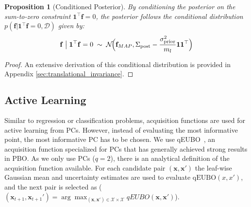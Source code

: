 \documentclass{article}
\newtheorem{proposition}{Proposition}
\begin{document}
\begin{proposition}[Conditioned Posterior]\label{prop:conditional}By conditioning the posterior on the sum-to-zero constraint $\mathbf{1}^\top\mathbf{f} = 0$, the posterior follows the conditional distribution $p(\mathbf{f}|\mathbf{1}^\top\mathbf{f} = 0, \mathcal{D})$ given by:$$ \mathbf{f}\;\bigl|\;\mathbf{1}^\top\mathbf{f} = 0 \;\sim\; \mathcal{N}\!\Bigl(\mathbf{f}_{MAP}, \Sigma_{\mathrm{post}}-\frac{\sigma_{\mathrm{prior}}^2}{m_l}\mathbf{1}\mathbf{1}^{\top}\Bigr) $$
\end{proposition}\begin{proof} An extensive derivation of this conditional distribution is provided in Appendix \ref{sec:translational_invariance}. \end{proof}



\subsection{Active Learning}\label{subsec:active_learning}
Similar to regression or classification problems, acquisition functions are used for active learning from PCs. However, instead of evaluating the most informative point, the most informative PC has to be chosen. 
We use qEUBO~\cite{astudillo2023qeubodecisiontheoreticacquisitionfunction}, an acquisition function specialized for PCs that has generally achieved strong results in PBO. As we only use PCs ($q=2$), there is an analytical definition of the acquisition function available. For each candidate pair $(\mathbf{x},\mathbf{x}')$ the leaf-wise Gaussian mean and uncertainty estimates are used to evaluate $\text{qEUBO}(x,x')$, and the next pair is selected as ($(\mathbf{x}_{t+1}, \mathbf{x}_{t+1}') = \arg \max_{(\mathbf{x}, \mathbf{x}') \in \mathcal{X} \times \mathcal{X}}qEUBO(\mathbf{x}, \mathbf{x'})$). 
\end{document}
